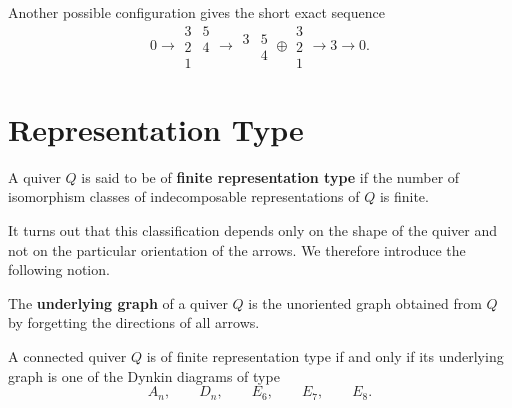 \documentclass[11pt, a4paper]{report}
\begin{document}
\begin{example}
    Another possible configuration gives the short exact sequence
    \[
        0
        \longrightarrow
        \begin{matrix}
            3 & 5\\[-1mm]
            2 & 4\\[-1mm]
            1 &
        \end{matrix}
        \longrightarrow
        \begin{matrix}
            3 & 5\\[-1mm]
              & 4
        \end{matrix}
        \oplus
        \begin{matrix}
            3\\[-1mm]
            2\\[-1mm]
            1
        \end{matrix}
        \longrightarrow
        3
        \longrightarrow
        0.
    \]
\end{example}

\section{Representation Type}

\begin{definition}
    A quiver \(Q\) is said to be of \textbf{finite representation type} if the
    number of isomorphism classes of indecomposable representations of \(Q\) is
    finite.
\end{definition}

It turns out that this classification depends only on the shape of the quiver and
not on the particular orientation of the arrows. We therefore introduce the following
notion.

\begin{definition}
    The \textbf{underlying graph} of a quiver \(Q\) is the unoriented graph obtained
    from \(Q\) by forgetting the directions of all arrows.
\end{definition}

\begin{theorem}
    A connected quiver \(Q\) is of finite representation type if and only if its
    underlying graph is one of the Dynkin diagrams of type
    \[
        A_n,\qquad D_n,\qquad E_6,\qquad E_7,\qquad E_8.
    \]
\end{theorem}
\end{document}
